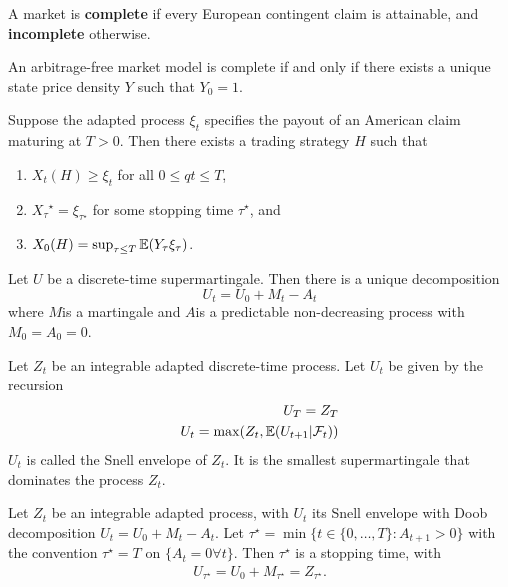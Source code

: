\begin{defn}
  \label{sec:pric-hedg-cont-5}
  A market is \textbf{complete} if every European contingent claim is
  attainable, and \textbf{incomplete} otherwise.
\end{defn}

\begin{thm}
  \label{sec:pric-hedg-cont-6}
  An arbitrage-free market model is complete if and only if there
  exists a unique state price density $Y$ such that $Y_{0} = 1$.
\end{thm}

\begin{thm}
  \label{sec:pric-hedg-cont-7}
  Suppose the adapted process $\xi_{t}$ specifies the payout of an
  American claim maturing at $T > 0$. Then there exists a trading
  strategy $H$ such that
  \begin{enumerate}
  \item $X_{t}(H) \geq \xi_{t}$ for all $0 \le qt \leq T$,
  \item $X_\tau{^\star} = \xi_{\tau^{\star}}$ for some stopping time
    $\tau^{\star}$, and
  \item $X_{0}(H) = \sup_{\tau \leq T} \E{Y_{\tau} \xi_{\tau}}$.
  \end{enumerate}
\end{thm}

\begin{thm}
  \label{sec:pric-hedg-cont-8}
  Let $U$ be a discrete-time supermartingale.  Then there is a unique
  decomposition
  \begin{equation}
    \label{eq:10}
    U_{t}= U_{0}+ M_{t} - A_{t}
  \end{equation} where $M$is a martingale and $A$is a predictable
  non-decreasing process with $M_{0} = A_{0} = 0$.
\end{thm}

\begin{defn}
  \label{sec:pric-hedg-cont-9}
  Let $Z_{t}$ be an integrable adapted discrete-time process. Let
  $U_{t}$ be given by the recursion
  \begin{align}
    \label{eq:11}
    U_{T} = Z_{T} \\
    U_{t} = \max (Z_{t}, \E{U_{t+1} | \mathcal{F}_{t}})
  \end{align}
  $U_{t}$ is called the Snell envelope of $Z_{t}$.  It is the smallest
  supermartingale that dominates the process $Z_{t}$.
\end{defn}

\begin{thm}
  \label{sec:pric-hedg-cont-11}
  Let $Z_{t}$ be an integrable adapted process, with $U_{t}$ its Snell
  envelope with Doob decomposition $U_{t} = U_{0} + M_{t} - A_{t}$.
  Let $\tau^{\star} = \min \{ t \in \{0, \dots, T\}: A_{t+1} > 0 \}$
  with the convention $\tau^{\star} = T$ on $\{ A_{t} = 0 \forall t
  \}$.  Then $\tau^{\star}$ is a stopping time, with
  \begin{align}
    \label{eq:12}
    U_{\tau^{\star}} = U_{0} + M_{\tau^{\star}} = Z_{\tau^{\star}}.
  \end{align}
\end{thm}

